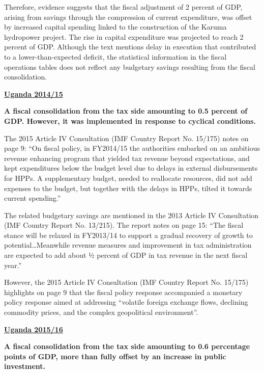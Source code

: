 Therefore, evidence suggests that the fiscal adjustment of 2 percent of GDP, arising from savings through the compression of current expenditure, was offset by increased capital spending linked to the construction of the Karuma hydropower project. The rise in capital expenditure was projected to reach 2 percent of GDP. Although the text mentions delay in execution that contributed to a lower-than-expected deficit, the statistical information in the fiscal operations tables does not reflect any budgetary savings resulting from the fiscal consolidation.

\textbf{\underline{Uganda 2014/15}}

\textbf{A fiscal consolidation from the tax side amounting to 0.5 percent of GDP. However, it was implemented in response to cyclical conditions.}

The 2015 Article IV Consultation (IMF Country Report No. 15/175) notes on page 9: “On fiscal policy, in FY2014/15 the authorities embarked on an ambitious revenue enhancing program that yielded tax revenue beyond expectations, and kept expenditures below the budget level due to delays in external disbursements for HPPs. A supplementary budget, needed to reallocate resources, did not add expenses to the budget, but together with the delays in HPPs, tilted it towards current spending.”

The related budgetary savings are mentioned in the 2013 Article IV Consultation (IMF Country Report No. 13/215). The report notes on page 15: “The fiscal stance will be relaxed in FY2013/14 to support a gradual recovery of growth to potential…Meanwhile revenue measures and improvement in tax administration are expected to add about ½ percent of GDP in tax revenue in the next fiscal year.”

However, the 2015 Article IV Consultation (IMF Country Report No. 15/175) highlights on page 9 that the fiscal policy response accompanied a monetary policy response aimed at addressing “volatile foreign exchange flows, declining commodity prices, and the complex geopolitical environment”.

\textbf{\underline{Uganda 2015/16}}

\textbf{A fiscal consolidation from the tax side amounting to 0.6 percentage points of GDP, more than fully offset by an increase in public investment.}

